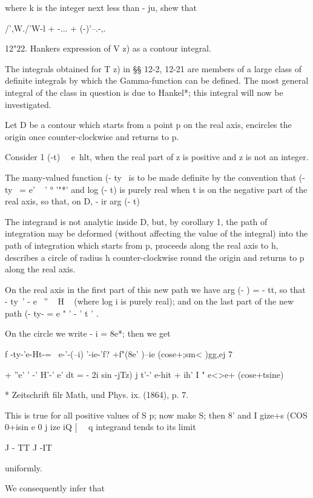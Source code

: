 where k is the integer next less than - ju, shew that

/',W./'W-l + -... + (-)'--.-,. 

12"22. Hankers expression of V z) as a contour integral.

The integrals obtained for T z) in §§ 12-2, 12-21 are members of a
large class of definite integrals by which the Gamma-function can be
defined. The most general integral of the class in question is due to
Hankel*; this integral will now be investigated.

Let D be a contour which starts from a point p on the real axis,
encircles the origin once counter-clockwise and returns to p.

Consider 1 (-t)~~ e~hlt, when the real part of z is positive and z is
not an integer.

The many-valued function (- ty~ is to be made definite by the
convention that (- ty~ = e' ~ ' ° '"*' and log (- t) is purely real
when t is on the negative part of the real axis, so that, on D, - ir %
arg (- t) %

The integrand is not analytic inside D, but, by corollary 1, the
path of integration may be deformed (without affecting the value of
the integral) into the path of integration which starts from p,
proceeds along the real axis to h, describes a circle of radius h
counter-clockwise round the origin and returns to p along the real
axis.

On the real axis in the first part of this new path we have arg (- ) =
- tt, so that - ty~' - e~ '' ~ H ~ (where log i is purely real); and
on the last part of the new path (- ty- = e " ' - ' t ' .

On the circle we write - i = 8e*; then we get

f -ty-'e-Ht-= \ e-'-(--i) '-ie-'f? +f"(8e' )--ie (cose+;sm< )gg,ej 7

+ ''e' ' -' H'-' e' dt = - 2i sin -jTz) j t'-' e-hit + ih' I " e<>e+
(cose+tsine) \

* Zeitschrift filr Math, und Phys. ix. (1864), p. 7.

%
%

This is true for all positive values of S p; now make S; then 8' and
I gize+s (COS 0+isin e 0 j ize iQ [ \ \ q integrand tends to its limit

J - TT J -IT

uniformly.

We consequently infer that

